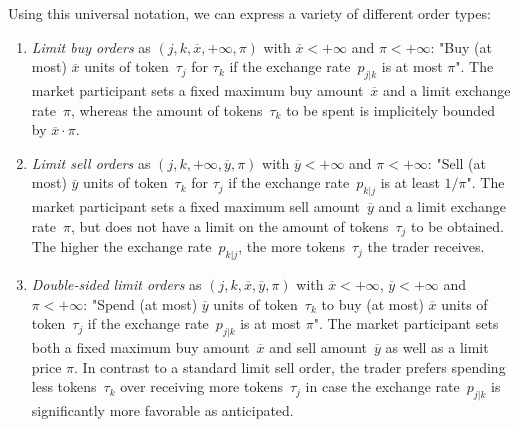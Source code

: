 \documentclass[11pt,parskip=full]{scrartcl}%
\begin{document}
Using this universal notation, we can express a variety of different order types:
\begin{enumerate}
  \item \emph{Limit buy orders} as $(j,k,\overline{x},+\infty,\pi)$
    with $\overline{x} < +\infty$ and $\pi < +\infty$:
  \vspace{.2cm}\newline
  "Buy (at most) $\overline{x}$ units of token~$\tau_j$ for $\tau_k$
  if the exchange rate~$p_{j|k}$ is at most $\pi$".
  \vspace{.2cm}\newline
  The market participant sets a fixed maximum buy amount~$\overline{x}$
  and a limit exchange rate~$\pi$, whereas the amount of tokens~$\tau_k$ to be spent is
  implicitely bounded by $\overline{x} \cdot \pi$.

  \item \emph{Limit sell orders} as $(j,k,+\infty,\overline{y},\pi)$
    with $\overline{y} < +\infty$ and $\pi < +\infty$:
  \vspace{.2cm}\newline
  "Sell (at most) $\overline{y}$ units of token~$\tau_k$ for $\tau_j$
  if the exchange rate~$p_{k|j}$ is at least $1/\pi$".
  \vspace{.2cm}\newline
  The market participant sets a fixed maximum sell amount~$\overline{y}$
  and a limit exchange rate~$\pi$, but does not have a limit on the amount of tokens~$\tau_j$
  to be obtained.
  The higher the exchange rate~$p_{k|j}$, the more tokens~$\tau_j$ the trader receives.

  \item \emph{Double-sided limit orders} as $(j,k,\overline{x},\overline{y},\pi)$
    with $\overline{x} < +\infty$, $\overline{y} < +\infty$ and $\pi < +\infty$:
  \vspace{.2cm}\newline
  "Spend (at most) $\overline{y}$ units of token~$\tau_k$
  to buy (at most) $\overline{x}$ units of token~$\tau_j$
  if the exchange rate~$p_{j|k}$ is at most $\pi$".
  \vspace{.2cm}\newline
  The market participant sets both a fixed maximum buy amount~$\overline{x}$
  and sell amount~$\overline{y}$ as well as a limit price $\pi$.
  In contrast to a standard limit sell order, the trader prefers spending less tokens~$\tau_k$
  over receiving more tokens~$\tau_j$ in case the exchange rate~$p_{j|k}$ is significantly
  more favorable as anticipated.


\end{enumerate}
\end{document}

